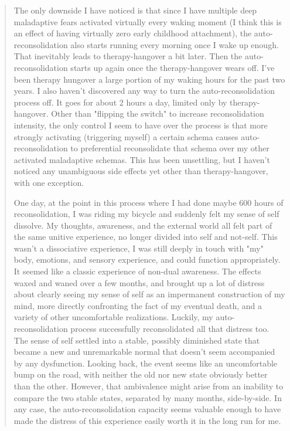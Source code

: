 \documentclass[12pt,letterpaper]{book}
\begin{document}
\begin{quotation}
    The only downside I have noticed is that since I have multiple deep maladaptive fears activated virtually every waking moment (I think this is an effect of having virtually zero early childhood attachment), the auto-reconsolidation also starts running every morning once I wake up enough. That inevitably leads to therapy-hangover a bit later. Then the auto-reconsolidation starts up again once the therapy-hangover wears off. I've been therapy hungover a large portion of my waking hours for the past two years. I also haven't discovered any way to turn the auto-reconsolidation process off. It goes for about 2 hours a day, limited only by therapy-hangover. Other than "flipping the switch" to increase reconsolidation intensity, the only control I seem to have over the process is that more strongly activating (triggering myself) a certain schema causes auto-reconsolidation to preferential reconsolidate that schema over my other activated maladaptive schemas. This has been unsettling, but I haven't noticed any unambiguous side effects yet other than therapy-hangover, with one exception.

    One day, at the point in this process where I had done maybe 600 hours of reconsolidation, I was riding my bicycle and suddenly felt my sense of self dissolve. My thoughts, awareness, and the external world all felt part of the same unitive experience, no longer divided into self and not-self. This wasn't a dissociative experience, I was still deeply in touch with "my" body, emotions, and sensory experience, and could function appropriately. It seemed like a classic experience of non-dual awareness. The effects waxed and waned over a few months, and brought up a lot of distress about clearly seeing my sense of self as an impermanent construction of my mind, more directly confronting the fact of my eventual death, and a variety of other uncomfortable realizations. Luckily, my auto-reconsolidation process successfully reconsolidated all that distress too. The sense of self settled into a stable, possibly diminished state that became a new and unremarkable normal that doesn't seem accompanied by any dysfunction. Looking back, the event seems like an uncomfortable bump on the road, with neither the old nor new state obviously better than the other. However, that ambivalence might arise from an inability to compare the two stable states, separated by many months, side-by-side. In any case, the auto-reconsolidation capacity seems valuable enough to have made the distress of this experience easily worth it in the long run for me.


\end{quotation}
\end{document}
